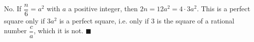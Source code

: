 No. If $\dfrac n6=a^2$ with $a$ a positive integer, then $2n=12a^2=4\cdot3a^2$. This is a perfect square only if $3a^2$ is a perfect square, i.e. only if $3$ is the square of a rational number $\dfrac{c}{a}$, which it is not. $\blacksquare$
